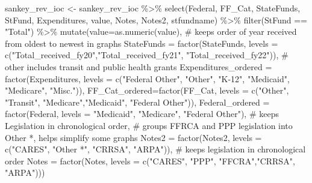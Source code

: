 \documentclass[
  letterpaper,
  DIV=11,
  numbers=noendperiod]{scrreport}
\newenvironment{Shaded}{\begin{snugshade}}{\end{snugshade}}
\newcommand{\AttributeTok}[1]{\textcolor[rgb]{0.40,0.45,0.13}{#1}}
\newcommand{\CommentTok}[1]{\textcolor[rgb]{0.37,0.37,0.37}{#1}}
\newcommand{\FunctionTok}[1]{\textcolor[rgb]{0.28,0.35,0.67}{#1}}
\newcommand{\NormalTok}[1]{\textcolor[rgb]{0.00,0.23,0.31}{#1}}
\newcommand{\OtherTok}[1]{\textcolor[rgb]{0.00,0.23,0.31}{#1}}
\newcommand{\SpecialCharTok}[1]{\textcolor[rgb]{0.37,0.37,0.37}{#1}}
\newcommand{\StringTok}[1]{\textcolor[rgb]{0.13,0.47,0.30}{#1}}
\begin{document}
\begin{Shaded}
\begin{Highlighting}[]
\NormalTok{sankey\_rev\_ioc }\OtherTok{\textless{}{-}}\NormalTok{ sankey\_rev\_ioc }\SpecialCharTok{\%\textgreater{}\%} \FunctionTok{select}\NormalTok{(Federal, FF\_Cat, StateFunds, StFund, Expenditures, value, Notes, Notes2, stfundname) }\SpecialCharTok{\%\textgreater{}\%}
  \FunctionTok{filter}\NormalTok{(StFund }\SpecialCharTok{==} \StringTok{"Total"}\NormalTok{) }\SpecialCharTok{\%\textgreater{}\%}
  \FunctionTok{mutate}\NormalTok{(}\AttributeTok{value=}\FunctionTok{as.numeric}\NormalTok{(value),}
         \CommentTok{\# keeps order of year received from oldest to newest in graphs}
    \AttributeTok{StateFunds =} \FunctionTok{factor}\NormalTok{(StateFunds, }\AttributeTok{levels =} \FunctionTok{c}\NormalTok{(}\StringTok{"Total\_received\_fy20"}\NormalTok{,}\StringTok{"Total\_received\_fy21"}\NormalTok{, }\StringTok{"Total\_received\_fy22"}\NormalTok{)),}
    \CommentTok{\# other includes transit and public health grants}
                 \AttributeTok{Expenditures\_ordered =} \FunctionTok{factor}\NormalTok{(Expenditures, }\AttributeTok{levels =} \FunctionTok{c}\NormalTok{(}\StringTok{"Federal Other"}\NormalTok{, }\StringTok{"Other"}\NormalTok{,  }\StringTok{"K{-}12"}\NormalTok{,  }\StringTok{"Medicaid"}\NormalTok{, }\StringTok{"Medicare"}\NormalTok{, }\StringTok{"Misc."}\NormalTok{)),}
    \AttributeTok{FF\_Cat\_ordered=}\FunctionTok{factor}\NormalTok{(FF\_Cat, }\AttributeTok{levels =} \FunctionTok{c}\NormalTok{(}\StringTok{"Other"}\NormalTok{, }\StringTok{"Transit"}\NormalTok{, }\StringTok{"Medicare"}\NormalTok{,}\StringTok{"Medicaid"}\NormalTok{, }\StringTok{"Federal Other"}\NormalTok{)),}
    \AttributeTok{Federal\_ordered =} \FunctionTok{factor}\NormalTok{(Federal, }\AttributeTok{levels =} \StringTok{"Medicaid"}\NormalTok{, }\StringTok{"Medicare"}\NormalTok{, }\StringTok{"Federal Other"}\NormalTok{),}
    \CommentTok{\# keeps Legislation in chronological order,}
    \CommentTok{\# groups FFRCA and PPP legislation into Other *, helps simplify some graphs }
         \AttributeTok{Notes2 =} \FunctionTok{factor}\NormalTok{(Notes2, }\AttributeTok{levels =} \FunctionTok{c}\NormalTok{(}\StringTok{"CARES"}\NormalTok{, }\StringTok{"Other *"}\NormalTok{, }\StringTok{"CRRSA"}\NormalTok{, }\StringTok{"ARPA"}\NormalTok{)),}
        \CommentTok{\# keeps legislation in chronological order}
         \AttributeTok{Notes =} \FunctionTok{factor}\NormalTok{(Notes, }\AttributeTok{levels =} \FunctionTok{c}\NormalTok{(}\StringTok{"CARES"}\NormalTok{,  }\StringTok{"PPP"}\NormalTok{, }\StringTok{"FFCRA"}\NormalTok{,}\StringTok{"CRRSA"}\NormalTok{, }\StringTok{"ARPA"}\NormalTok{)))}


\end{Highlighting}
\end{Shaded}
\end{document}
